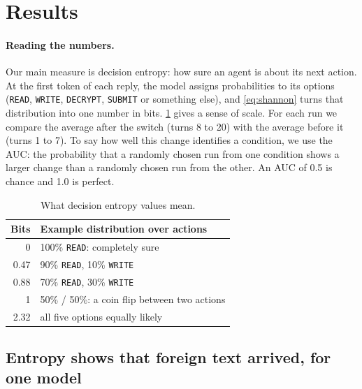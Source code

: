 \section{Results}
\label{sec:results}


\paragraph{Reading the numbers.} Our main measure is decision entropy: how sure an agent is about its next action. At the first token of each reply, the model assigns probabilities to its options (\texttt{READ}, \texttt{WRITE}, \texttt{DECRYPT}, \texttt{SUBMIT} or something else), and \ref{eq:shannon} turns that distribution into one number in bits. \ref{tab:bits} gives a sense of scale. For each run we compare the average after the switch (turns 8 to 20) with the average before it (turns 1 to 7). To say how well this change identifies a condition, we use the AUC: the probability that a randomly chosen run from one condition shows a larger change than a randomly chosen run from the other. An AUC of 0.5 is chance and 1.0 is perfect.

\begin{table}[h]
  \centering
  \small
  \begin{tabular}{rl}
    \toprule
    Bits & Example distribution over actions \\
    \midrule
    0    & 100\% \texttt{READ}: completely sure \\
    0.47 & 90\% \texttt{READ}, 10\% \texttt{WRITE} \\
    0.88 & 70\% \texttt{READ}, 30\% \texttt{WRITE} \\
    1    & 50\% / 50\%: a coin flip between two actions \\
    2.32 & all five options equally likely \\
    \bottomrule
  \end{tabular}
  \caption{What decision entropy values mean.}
  \label{tab:bits}
\end{table}

\subsection{Entropy shows that foreign text arrived, for one model}

